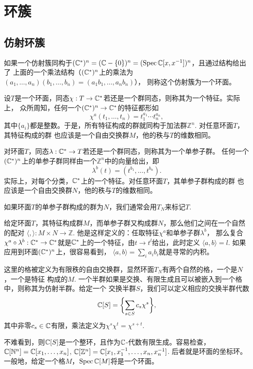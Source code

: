 \chapter{环簇}

\section{仿射环簇}

\para[环面] 如果一个仿射簇同构于$(\mathbb{C}^*)^n=(\mathbb{C}-\{0\})^n=(\operatorname{Spec}\mathbb{C}[x,x^{-1}])^n$，且通过结构给出了
上面的一个乘法结构（$(\mathbb{C}^*)^n$上的乘法为$(a_1,\dots,a_n)(b_1,\dots,b_n)=(a_1b_1,\dots,a_n b_n)$），
则称这个仿射簇为一个环面。

\para[特征] 设$T$是一个环面，同态$\chi:T\to \mathbb{C}^*$若还是一个群同态，则称其为一个特征。实际上，
众所周知，任何一个$(\mathbb{C}^*)^n\to \mathbb{C}^*$的特征都形如
\[
    \chi^a(t_1,\dots,t_n)=t_1^{a_1}\cdots t_n^{a_n},
\]
其中$\{a_i\}$都是整数。于是，所有特征构成的群就同构于加法群$\mathbb Z^n$. 对任意环面$T$，其特征构成的群
也应该是一个自由交换群$M$，他的秩与$T$的维数相同。

\para[单参子群] 对环面$T$，同态$\lambda:\mathbb{C}^*\to T$若还是一个群同态，则称其为一个单参子群。
任何一个$(\mathbb{C}^*)^n$上的单参子群同样由一个$\mathbb Z^n$中的向量给出，即
\[
    \lambda^b(t)=(t^{b_1},\dots,t^{b_n}).
\]
实际上，对每个分类，$\mathbb{C}^*$上的一个特征。对任意环面$T$，其单参子群构成的群
也应该是一个自由交换群$N$，他的秩与$T$的维数相同。

如果环面$T$的单参子群构成的群为$N$，我们通常会用$T_N$来标记$T$.

\para 给定环面$T$，其特征构成群$M$，而单参子群又构成群$N$，那么他们之间在一个自然的配对
$\langle ,\rangle:M\times N\to \mathbb{Z}$. 他是这样定义的：任取特征$\chi^a$和单参子群$\lambda^b$，
那么复合$\chi^a\circ\lambda^b:\mathbb{C}^*\to \mathbb{C}^*$就是$\mathbb{C}^*$上的一个特征，由$t\to t^l$给出，此时定义
$\langle a,b\rangle=l$. 如果应用到环面$(\mathbb{C}^*)^n$上，很容易看到，
$\langle a,b\rangle=\sum_{i}a_ib_i$就是寻常的内积。

\para[格与仿射半群] 这里的格被定义为有限秩的自由交换群，显然环面$T_N$有两个自然的格，一个是$N$，一个是特征
构成的$M$. 一个半群如果是交换、有限生成且可以被嵌入到一个格中，则称其为仿射半群。给定一个
交换半群$S$，我们可以定义相应的交换半群代数
\[
    \mathbb{C}[S]=\biggl\{\sum_{s\in S}c_s \chi^s\biggr\},
\]
其中非零$c_s\in \mathbb{C}$有限，乘法定义为$\chi^s\chi^t=\chi^{s+t}$.

不难看到，则$\mathbb{C}[S]$是一个整环，且作为$\mathbb{C}$-代数有限生成。容易检查，
$\mathbb{C}[\mathbb N^n]=\mathbb{C}[x_1,\dots,x_n]$, $\mathbb{C}[\mathbb Z^n]=\mathbb{C}[x_1,x_1^{-1},\dots,x_n,x_n^{-1}]$. 
后者就是环面的坐标环。一般地，给定一个格$M$，$\operatorname{Spec} \mathbb{C}[M]$将是一个环面。

